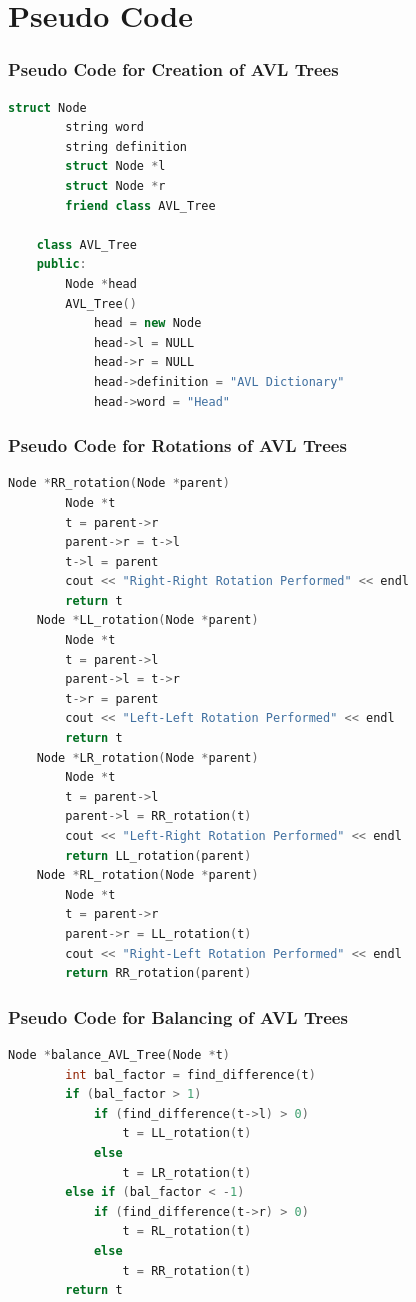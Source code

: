 \documentclass[11pt]{article}
\begin{document}
\section{Pseudo Code}
\subsubsection*{Pseudo Code for Creation of AVL Trees}
\begin{lstlisting}[language=C++]
    struct Node
        string word
        string definition
        struct Node *l
        struct Node *r
        friend class AVL_Tree
    
    class AVL_Tree
    public:
        Node *head
        AVL_Tree()
            head = new Node
            head->l = NULL
            head->r = NULL
            head->definition = "AVL Dictionary"
            head->word = "Head"
\end{lstlisting}

\subsubsection*{Pseudo Code for Rotations of AVL Trees}
\begin{lstlisting}[language=C++]
    Node *RR_rotation(Node *parent)
		Node *t
		t = parent->r
		parent->r = t->l
		t->l = parent
		cout << "Right-Right Rotation Performed" << endl
		return t
	Node *LL_rotation(Node *parent)
		Node *t
		t = parent->l
		parent->l = t->r
		t->r = parent
		cout << "Left-Left Rotation Performed" << endl
		return t
	Node *LR_rotation(Node *parent)
		Node *t
		t = parent->l
		parent->l = RR_rotation(t)
		cout << "Left-Right Rotation Performed" << endl
		return LL_rotation(parent)
	Node *RL_rotation(Node *parent)
		Node *t
		t = parent->r
		parent->r = LL_rotation(t)
		cout << "Right-Left Rotation Performed" << endl
		return RR_rotation(parent)
\end{lstlisting}

\subsubsection*{Pseudo Code for Balancing of AVL Trees}
\begin{lstlisting}[language=C++]
    Node *balance_AVL_Tree(Node *t)
		int bal_factor = find_difference(t)
		if (bal_factor > 1)
			if (find_difference(t->l) > 0)
				t = LL_rotation(t)
			else
				t = LR_rotation(t)
		else if (bal_factor < -1)
			if (find_difference(t->r) > 0)
				t = RL_rotation(t)
			else
				t = RR_rotation(t)
		return t
\end{lstlisting}
\end{document}
